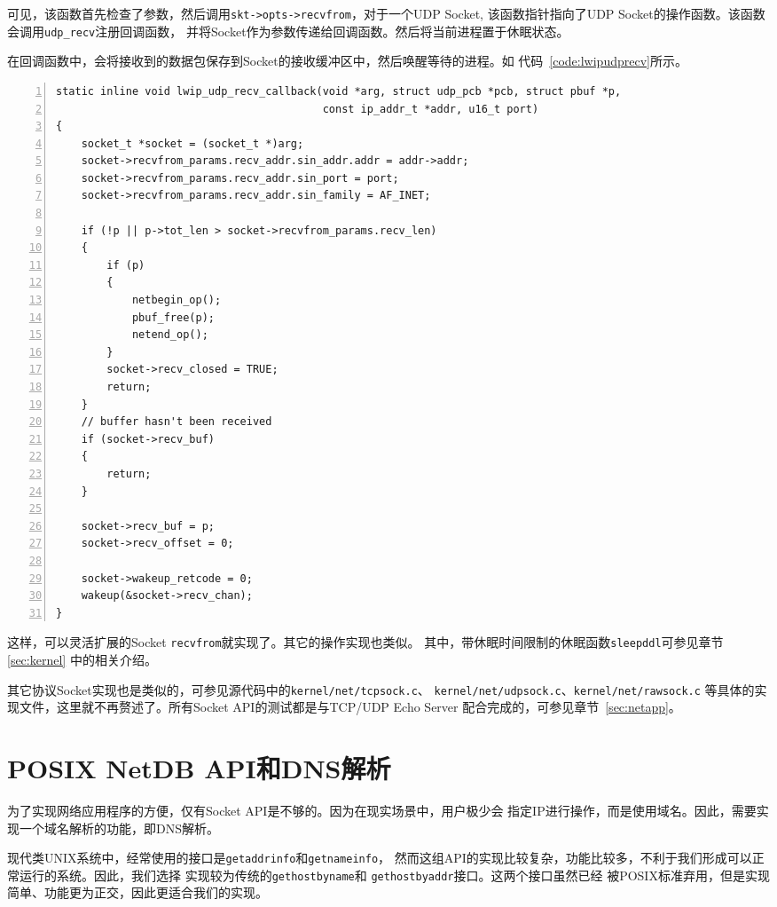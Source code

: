 \documentclass[a4paper,twoside]{ctexrep}
\begin{document}
\begin{spacing}{1.2}
可见，该函数首先检查了参数，然后调用\texttt{skt->opts->recvfrom}，对于一个UDP Socket,
该函数指针指向了UDP Socket的操作函数。该函数会调用\texttt{udp\_recv}注册回调函数，
并将Socket作为参数传递给回调函数。然后将当前进程置于休眠状态。

在回调函数中，会将接收到的数据包保存到Socket的接收缓冲区中，然后唤醒等待的进程。如
代码~\ref{code:lwipudprecv}所示。
\begin{lstlisting}[numbers=left,style=CppStyle,caption={LWIP的接受回调},label={code:lwipudprecv}]
static inline void lwip_udp_recv_callback(void *arg, struct udp_pcb *pcb, struct pbuf *p,
										  const ip_addr_t *addr, u16_t port)
{
	socket_t *socket = (socket_t *)arg;
	socket->recvfrom_params.recv_addr.sin_addr.addr = addr->addr;
	socket->recvfrom_params.recv_addr.sin_port = port;
	socket->recvfrom_params.recv_addr.sin_family = AF_INET;

	if (!p || p->tot_len > socket->recvfrom_params.recv_len)
	{
		if (p)
		{
			netbegin_op();
			pbuf_free(p);
			netend_op();
		}
		socket->recv_closed = TRUE;
		return;
	}
	// buffer hasn't been received
	if (socket->recv_buf)
	{
		return;
	}

	socket->recv_buf = p;
	socket->recv_offset = 0;

	socket->wakeup_retcode = 0;
	wakeup(&socket->recv_chan);
}
\end{lstlisting}


这样，可以灵活扩展的Socket \texttt{recvfrom}就实现了。其它的操作实现也类似。
其中，带休眠时间限制的休眠函数\texttt{sleepddl}可参见章节\ref{sec:kernel}
中的相关介绍。

其它协议Socket实现也是类似的，可参见源代码中的\texttt{kernel/net/tcpsock.c}、
\texttt{kernel/net/udpsock.c}、\texttt{kernel/net/rawsock.c}
等具体的实现文件，这里就不再赘述了。所有Socket API的测试都是与TCP/UDP Echo Server
配合完成的，可参见章节~\ref{sec:netapp}。

\section{POSIX NetDB API和DNS解析}

为了实现网络应用程序的方便，仅有Socket API是不够的。因为在现实场景中，用户极少会
指定IP进行操作，而是使用域名。因此，需要实现一个域名解析的功能，即DNS解析。

现代类UNIX系统中，经常使用的接口是\texttt{getaddrinfo}和\texttt{getnameinfo}，
然而这组API的实现比较复杂，功能比较多，不利于我们形成可以正常运行的系统。因此，我们选择
实现较为传统的\texttt{gethostbyname}和
\texttt{gethostbyaddr}接口。这两个接口虽然已经
被POSIX标准弃用，但是实现简单、功能更为正交，因此更适合我们的实现。


\end{spacing}
\end{document}
